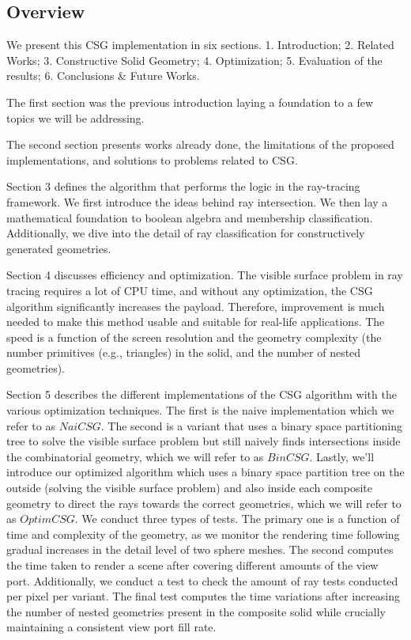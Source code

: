 \documentclass[a4paper,11pt,oneside]{article}
\begin{document}
\subsection{Overview}
  
We present this CSG implementation in six sections. 1. Introduction;  2. Related Works; 3. Constructive Solid Geometry; 4. Optimization; 5. Evaluation of the results; 6. Conclusions \& Future Works.

The first section was the previous introduction laying a foundation to a few topics we will be addressing. 
  
The second section presents works already done, the limitations of the proposed implementations, and solutions to problems related to CSG.
  
Section 3 defines the algorithm that performs the logic in the ray-tracing framework. We first introduce the ideas behind ray intersection. We then lay a mathematical foundation to boolean algebra and membership classification. Additionally, we dive into the detail of ray classification for constructively generated geometries. 
  
Section 4 discusses efficiency and optimization. The visible surface problem in ray tracing requires a lot of CPU time, and without any optimization, the CSG algorithm significantly increases the payload. Therefore, improvement is much needed to make this method usable and suitable for real-life applications. The speed is a function of the screen resolution and the geometry complexity (the number primitives (e.g., triangles) in the solid, and the number of nested geometries).
  
Section 5 describes the different implementations of the CSG algorithm with the various optimization techniques. The first is the naive implementation which we refer to as $NaiCSG$. The second is a variant that uses a binary space partitioning tree to solve the visible surface problem but still naively finds intersections inside the combinatorial geometry, which we will refer to as $BinCSG$. Lastly, we'll introduce our optimized algorithm which uses a binary space partition tree on the outside (solving the visible surface problem) and also inside each composite geometry to direct the rays towards the correct geometries, which we will refer to as $OptimCSG$. We conduct three types of tests. The primary one is a function of time and complexity of the geometry, as we monitor the rendering time following gradual increases in the detail level of two sphere meshes. The second computes the time taken to render a scene after covering different amounts of the view port. Additionally, we conduct a test to check the amount of ray tests conducted per pixel per variant. The final test computes the time variations after increasing the number of nested geometries present in the composite solid while crucially maintaining a consistent view port fill rate.
  
\end{document}

